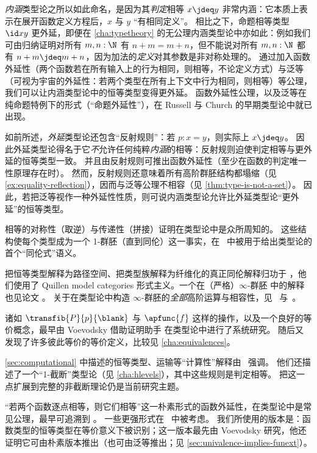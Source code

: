 \emph{内涵}类型论之所以如此命名，是因为其\emph{判定}相等 $x\jdeq y$ 非常内涵：它本质上表示在展开函数定义方程后，$x$ 与 $y$ “有相同定义”。
相比之下，命题相等类型 $\id xy$ 更外延，即便在 \cref{cha:typetheory} 的无公理内涵类型论中亦如此：例如我们可由归纳证明对所有 $m,n:\N$ 有 $n+m=m+n$，但不能说对所有 $m,n:\N$ 都有 $n+m\jdeq m+n$，因为加法的\emph{定义}对其参数是非对称处理的。
通过加入函数外延性（两个函数若在所有输入上的行为相同，则相等，不论定义方式）与泛等（可视为宇宙的外延性：若两个类型在所有上下文中行为相同，则相等）等公理，我们可以让内涵类型论中的恒等类型变得更外延。
函数外延性公理，以及泛等在纯命题特例下的形式（“命题外延性”），在 Russell 与 Church 的早期类型论中就已出现。

如前所述，\emph{外延}类型论还包含“反射规则”：若 $p:x=y$，则实际上 $x\jdeq y$。
因此外延类型论得名于它\emph{不}允许任何纯粹\emph{内涵}的相等：反射规则迫使判定相等与更外延的恒等类型一致。
并且由反射规则可推出函数外延性（至少在函数的判定唯一性原理存在时）。
然而，反射规则还意味着所有高阶群胚结构都塌缩（见 \cref{ex:equality-reflection}），因而与泛等公理不相容（见 \cref{thm:type-is-not-a-set}）。
因此，若把泛等视作一种外延性性质，则可说内涵类型论允许比外延类型论“更外延”的恒等类型。

相等的对称性（取逆）与传递性（拼接）证明在类型论中是众所周知的。
这些结构使每个类型成为一个 1-群胚（直到同伦）这一事实，在~\cite{hs:gpd-typethy} 中被用于给出类型论的首个“同伦式”语义。

把恒等类型解释为路径空间、把类型族解释为纤维化的真正同伦解释归功于 \cite{AW}，他们使用了 Quillen model categories 形式主义。一个在（严格）$\infty$-群胚 中的解释也见论文 \cite{mw:thesis}。
关于在类型论中构造 $\infty$-群胚的\emph{全部}高阶运算与相容性，见~\cite{pll:wkom-type} 与~\cite{bg:type-wkom}。

%
诸如 $\transfib{P}{p}{\blank}$ 与 $\apfunc{f}$ 这样的操作，以及一个良好的等价概念，最早由 Voevodsky 借助证明助手 \Coq 在类型论中进行了系统研究。
随后又发现了许多彼此等价的等价定义，比较见 \cref{cha:equivalences}。

\cref{sec:computational} 中描述的恒等类型、运输等“计算性”解释由~\cite{lh:canonicity} 强调。
他们还描述了一个“1-截断”类型论（见 \cref{cha:hlevels}），其中这些规则是判定相等。
把这一点扩展到完整的非截断理论仍是当前研究主题。

%
“若两个函数逐点相等，则它们相等”这一朴素形式的函数外延性，在类型论中是常见公理，最早可追溯到 \cite{PM2}。
一些更强形式在~\cite{garner:depprod} 中被考虑。
我们所使用的版本是：函数类型的恒等类型在等价意义下被识别；这一版本最先由 Voevodsky 研究，他还证明它可由朴素版本推出（也可由泛等推出；见 \cref{sec:univalence-implies-funext}）。

